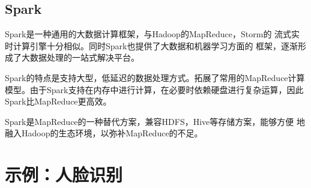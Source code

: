 \subsection{Spark}
Spark是一种通用的大数据计算框架，与Hadoop的MapReduce，Storm的
流式实时计算引擎十分相似。同时Spark也提供了大数据和机器学习方面的
框架，逐渐形成了大数据处理的一站式解决平台。

Spark的特点是支持大型，低延迟的数据处理方式。拓展了常用的MapReduce计算
模型。由于Spark支持在内存中进行计算，在必要时依赖硬盘进行复杂运算，因此
Spark比MapReduce更高效。

Spark是MapReduce的一种替代方案，兼容HDFS，Hive等存储方案，能够方便
地融入Hadoop的生态环境，以弥补MapReduce的不足。

\section{示例：人脸识别}


